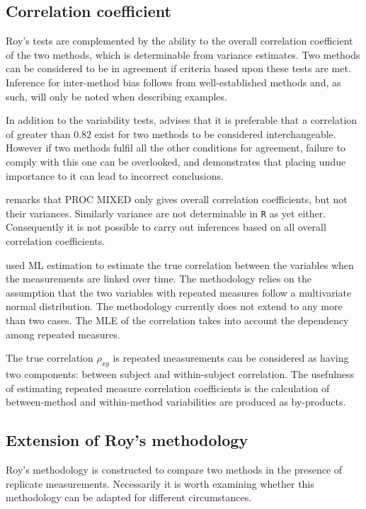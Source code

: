 \documentclass[12pt, a4paper]{report}
\theoremstyle{plain}
\theoremstyle{definition}
\theoremstyle{remark}
\begin{document}
	
	
	\subsection{Correlation coefficient}
	
	Roy's tests are complemented by the ability to the overall correlation coefficient of the two methods, which is determinable from variance estimates. Two methods can be considered to be in agreement if criteria based upon these tests are met. Inference for inter-method bias follows from well-established methods and, as such, will only be noted when describing examples.
	
	
	In addition to the variability tests, \citet{ARoy2009} advises that it is preferable that a correlation of greater than $0.82$ exist for two methods to be considered interchangeable. However if two methods fulfil all the other conditions for agreement, failure to comply with this one can be overlooked, and demonstrates that placing undue importance to it can lead to incorrect conclusions.
	
	\citet{ARoy2009} remarks that PROC MIXED only gives overall correlation coefficients, but not their variances. Similarly variance are not determinable in \texttt{R} as yet either. Consequently it is not possible to carry out inferences based on all overall correlation coefficients.
	
	\citet{lam} used ML estimation to estimate the true correlation between the variables when
	the measurements are linked over time. The methodology relies on the assumption that the two variables with repeated measures follow a multivariate normal distribution. The methodology currently does not extend to any more than two cases. The MLE of the correlation takes into account the dependency among repeated measures.
	
	The true correlation $\rho_{xy}$ is repeated measurements can be considered as having two components: between subject and within-subject correlation. The usefulness of estimating repeated measure correlation coefficients is the calculation of between-method and within-method variabilities are produced as by-products.
	
	

	\subsection{Extension of Roy's methodology}
	Roy's methodology is constructed to compare two methods in the presence of replicate measurements. Necessarily it is worth examining whether this methodology can be adapted for different circumstances.
	
\end{document}
